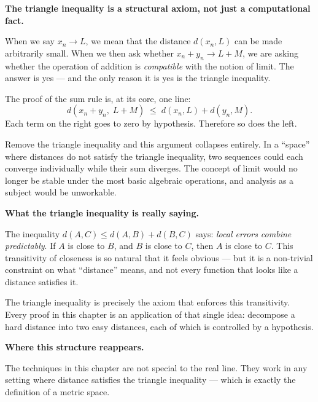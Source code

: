 \medskip

\noindent\textbf{The triangle inequality is a structural axiom, not just
a computational fact.}

When we say $x_n \to L$, we mean that the distance $d(x_n, L)$ can be
made arbitrarily small.
When we then ask whether $x_n + y_n \to L + M$, we are asking whether
the operation of addition is \emph{compatible} with the notion of limit.
The answer is yes — and the only reason it is yes is the triangle
inequality.

The proof of the sum rule is, at its core, one line:
\[
  d(x_n + y_n,\; L + M)
  \;\le\;
  d(x_n, L) + d(y_n, M).
\]
Each term on the right goes to zero by hypothesis.
Therefore so does the left.

Remove the triangle inequality and this argument collapses entirely.
In a ``space'' where distances do not satisfy the triangle inequality,
two sequences could each converge individually while their sum diverges.
The concept of limit would no longer be stable under the most basic
algebraic operations, and analysis as a subject would be unworkable.

\medskip

\noindent\textbf{What the triangle inequality is really saying.}

The inequality $d(A, C) \le d(A, B) + d(B, C)$ says:
\emph{local errors combine predictably}.
If $A$ is close to $B$, and $B$ is close to $C$, then $A$ is close to $C$.
This transitivity of closeness is so natural that it feels obvious —
but it is a non-trivial constraint on what ``distance'' means,
and not every function that looks like a distance satisfies it.

The triangle inequality is precisely the axiom that enforces this
transitivity. Every proof in this chapter is an application of that
single idea: decompose a hard distance into two easy distances,
each of which is controlled by a hypothesis.

\medskip

\noindent\textbf{Where this structure reappears.}

The techniques in this chapter are not special to the real line.
They work in any setting where distance satisfies the triangle
inequality — which is exactly the definition of a metric space.

